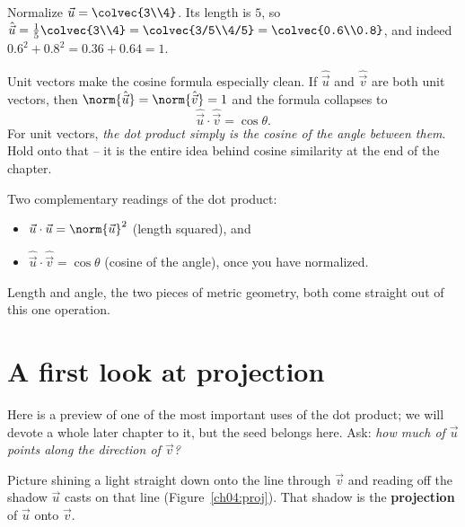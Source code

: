 \begin{example}
Normalize $\vec u = \colvec{3\\4}$. Its length is $5$, so
$\hat{\vec u} = \tfrac15\colvec{3\\4} = \colvec{3/5\\4/5} = \colvec{0.6\\0.8}$,
and indeed $0.6^2 + 0.8^2 = 0.36+0.64 = 1$. \checkmark
\end{example}

Unit vectors make the cosine formula especially clean. If $\hat{\vec u}$ and
$\hat{\vec v}$ are both unit vectors, then
$\norm{\hat{\vec u}}=\norm{\hat{\vec v}}=1$ and the formula collapses to
\[
  \hat{\vec u}\cdot\hat{\vec v} = \cos\theta.
\]
For unit vectors, \emph{the dot product simply is the cosine of the angle between
them}. Hold onto that -- it is the entire idea behind cosine similarity at the end
of the chapter.

\begin{focusbox}
Two complementary readings of the dot product:
\begin{itemize}
  \item $\vec u\cdot\vec u = \norm{\vec u}^2$ (length squared), and
  \item $\hat{\vec u}\cdot\hat{\vec v} = \cos\theta$ (cosine of the angle), once you
        have normalized.
\end{itemize}
Length and angle, the two pieces of metric geometry, both come straight out of this
one operation.
\end{focusbox}

\section{A first look at projection}

Here is a preview of one of the most important uses of the dot product; we will
devote a whole later chapter to it, but the seed belongs here. Ask: \emph{how much
of $\vec u$ points along the direction of $\vec v$?}

Picture shining a light straight down onto the line through $\vec v$ and reading off
the shadow $\vec u$ casts on that line (Figure~\ref{ch04:proj}). That shadow is the
\textbf{projection} of $\vec u$ onto $\vec v$.

